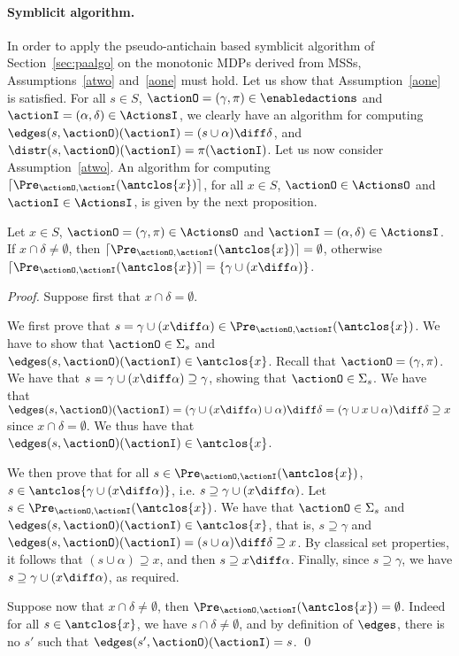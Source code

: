 \paragraph{Symblicit algorithm.} In order to apply the pseudo-antichain based symblicit algorithm of Section~\ref{sec:paalgo} on the monotonic MDPs derived from MSSs, Assumptions~\ref{atwo} and~\ref{aone} must hold. Let us show that Assumption~\ref{aone} is satisfied. For all $s \in S$, $\actionO = (\gamma, \pi) \in \enabledactions$ and $\actionI = (\alpha, \delta) \in \ActionsI$, we clearly have an algorithm for computing $\edges(s, \actionO)(\actionI) = (s \cup \alpha)\diff \delta$, and $\distr(s, \actionO)(\actionI) = \pi(\actionI)$. Let us now consider Assumption~\ref{atwo}. An algorithm for computing $\lceil \Pre_{\actionO,\actionI}(\antclos\{x\})\rceil$, for all $x \in S$, $\actionO \in \ActionsO$ and $\actionI \in \ActionsI$, is given by the next proposition. 
\begin{proposition}
Let $x \in S$, $\actionO = (\gamma, \pi) \in \ActionsO$ and $\actionI = (\alpha, \delta) \in \ActionsI$. If $x \cap \delta \neq \emptyset$, then  $\lceil \Pre_{\actionO,\actionI}(\antclos\{x\})\rceil = \emptyset$, otherwise $\lceil \Pre_{\actionO,\actionI}(\antclos\{x\})\rceil = \{\gamma \cup (x \diff \alpha)\}$.
\end{proposition}
\begin{proof}
Suppose first that $x \cap \delta = \emptyset$.

We first prove that $s = \gamma \cup (x \diff \alpha) \in \Pre_{\actionO,\actionI}(\antclos\{x\})$.  We have to show that $\actionO \in \Sigma_{s}$ and  $\edges(s, \actionO)(\actionI) \in \antclos\{x\}$. Recall that $\actionO = (\gamma, \pi)$. We have that $s = \gamma \cup (x\diff \alpha) \supseteq \gamma$, showing that $\actionO \in \Sigma_{s}$. We have that $\edges(s, \actionO)(\actionI)  = (\gamma \cup (x \diff \alpha) \cup \alpha) \diff \delta =  (\gamma \cup x \cup \alpha) \diff \delta \supseteq x$ since $x \cap \delta = \emptyset$. We thus have that $\edges(s, \actionO)(\actionI) \in \antclos\{x\}$.

We then prove that for all $s \in \Pre_{\actionO,\actionI}(\antclos\{x\})$, $s \in \antclos\{\gamma \cup (x \diff \alpha)\}$, i.e. $s \supseteq \gamma \cup (x \diff \alpha)$. Let $s \in \Pre_{\actionO,\actionI}(\antclos\{x\})$. We have that $\actionO \in \Sigma_{s}$ and $\edges(s, \actionO)(\actionI) \in \antclos\{x\}$, that is,  $s \supseteq \gamma$ and $\edges(s, \actionO)(\actionI) = (s \cup \alpha) \diff \delta \supseteq x$. By classical set properties, it follows that $(s \cup \alpha) \supseteq x$, and then $s  \supseteq x\diff\alpha$. Finally, since $s \supseteq \gamma$, we have $s \supseteq \gamma \cup (x \diff \alpha)$, as required.

Suppose now that $x \cap \delta \neq \emptyset$, then $\Pre_{\actionO,\actionI}(\antclos\{x\}) = \emptyset$. Indeed for all $s \in \antclos\{x\}$, we have  $s \cap \delta \neq \emptyset$, and by definition of $\edges$, there is no $s'$ such that $\edges(s', \actionO)(\actionI) = s$.
\qed\end{proof}

